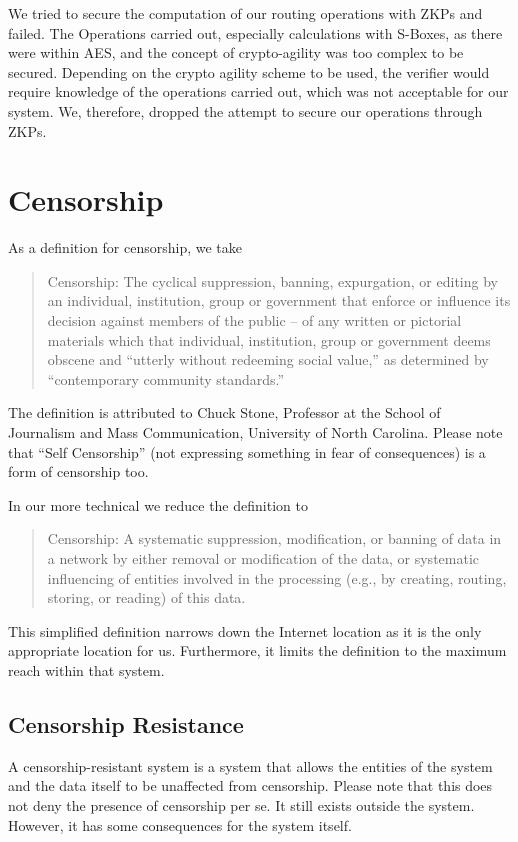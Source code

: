 We tried to secure the computation of our routing operations with ZKPs and failed. The Operations carried out, especially calculations with S-Boxes, as there were within AES, and the concept of crypto-agility was too complex to be secured. Depending on the crypto agility scheme to be used, the verifier would require knowledge of the operations carried out, which was not acceptable for our system. We, therefore, dropped the attempt to secure our operations through ZKPs.

\section{Censorship}
As a definition for censorship, we take
\begin{quote}
	Censorship: The cyclical suppression, banning, expurgation, or editing by an individual, institution, group or government that enforce or influence its decision against members of the public -- of any written or pictorial materials which that individual, institution, group or government deems obscene and ``utterly without redeeming social value,'' as determined by ``contemporary community standards.''
\end{quote}

The definition is attributed to Chuck Stone, Professor at the School of Journalism and Mass Communication, University of North Carolina. Please note that ``Self Censorship'' (not expressing something in fear of consequences) is a form of censorship too.

In our more technical we reduce the definition to
\begin{quote}
	Censorship: A systematic suppression, modification, or banning of data in a network by either removal or modification of the data, or systematic influencing of entities involved in the processing (e.g., by creating, routing, storing, or reading) of this data.
\end{quote}
This simplified definition narrows down the Internet location as it is the only appropriate location for us.  Furthermore, it limits the definition to the maximum reach within that system.

\subsection{Censorship Resistance}
A censorship-resistant system is a system that allows the entities of the system and the data itself to be unaffected from censorship. Please note that this does not deny the presence of censorship per se. It still exists outside the system. However, it has some consequences for the system itself.

